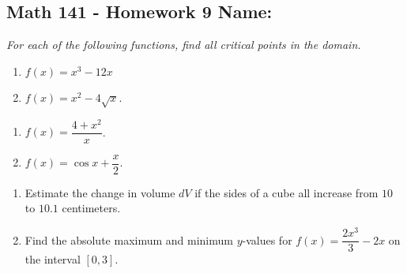\documentclass[11pt]{article}
\begin{document}
\pagestyle{empty}
\subsection*{Math 141 - Homework 9 \hfill Name: \underline{\hspace*{2in}}}



\textit{For each of the following functions, find all critical points in the domain.}
\noindent
\begin{multicols}{2}
\begin{enumerate}
\item $f(x) = x^3 - 12x$
\item $f(x) = x^2 - 4\sqrt{x}$.
\setcounter{enumCount}{\theenumi}
\end{enumerate}
\end{multicols}
\vfill


\begin{multicols}{2}
\begin{enumerate}
\setcounter{enumi}{\theenumCount}
\item $f(x) = \dfrac{4+x^2}{x}$.
\item $f(x) = \cos x + \dfrac{x}{2}$.
\setcounter{enumCount}{\theenumi}
\end{enumerate}
\end{multicols}
\vfill

\begin{enumerate}
\setcounter{enumi}{\theenumCount}


\item Estimate the change in volume $dV$ if the sides of a cube all increase from $10$ to $10.1$ centimeters. 
\vfill



\item Find the absolute maximum and minimum $y$-values for $f(x) = \dfrac{2x^{3}}{3}-2x$ on the interval $[0,3]$.
\vfill


\setcounter{enumCount}{\theenumi}
\end{enumerate}
\end{document}
